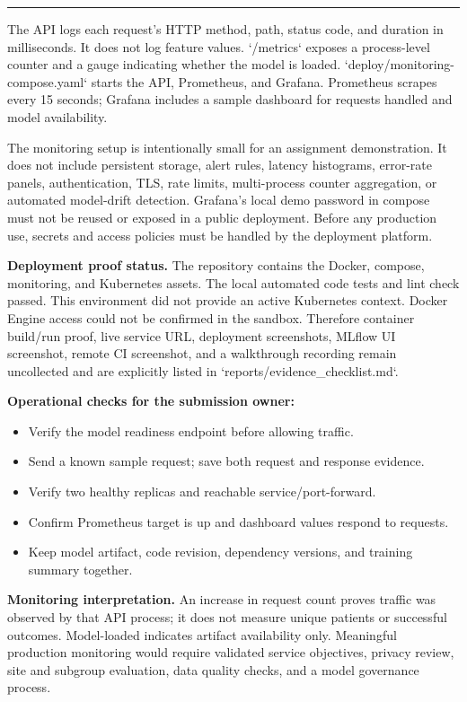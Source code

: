\documentclass[10pt]{article}
\newcommand{\sectiontitle}[1]{\vspace*{0.15in}{\Large\bfseries\color{navy}#1}\par\vspace{0.08in}\hrule\vspace{0.16in}}
\begin{document}
\newpage
\sectiontitle{8. Monitoring, logging, and operational boundaries}
The API logs each request's HTTP method, path, status code, and duration in milliseconds. It does not log feature values. `/metrics` exposes a process-level counter and a gauge indicating whether the model is loaded. `deploy/monitoring-compose.yaml` starts the API, Prometheus, and Grafana. Prometheus scrapes every 15 seconds; Grafana includes a sample dashboard for requests handled and model availability.

The monitoring setup is intentionally small for an assignment demonstration. It does not include persistent storage, alert rules, latency histograms, error-rate panels, authentication, TLS, rate limits, multi-process counter aggregation, or automated model-drift detection. Grafana's local demo password in compose must not be reused or exposed in a public deployment. Before any production use, secrets and access policies must be handled by the deployment platform.

\textbf{Deployment proof status.} The repository contains the Docker, compose, monitoring, and Kubernetes assets. The local automated code tests and lint check passed. This environment did not provide an active Kubernetes context. Docker Engine access could not be confirmed in the sandbox. Therefore container build/run proof, live service URL, deployment screenshots, MLflow UI screenshot, remote CI screenshot, and a walkthrough recording remain uncollected and are explicitly listed in `reports/evidence_checklist.md`.

\textbf{Operational checks for the submission owner:}
\begin{itemize}
\item Verify the model readiness endpoint before allowing traffic.
\item Send a known sample request; save both request and response evidence.
\item Verify two healthy replicas and reachable service/port-forward.
\item Confirm Prometheus target is up and dashboard values respond to requests.
\item Keep model artifact, code revision, dependency versions, and training summary together.
\end{itemize}

\textbf{Monitoring interpretation.} An increase in request count proves traffic was observed by that API process; it does not measure unique patients or successful outcomes. Model-loaded indicates artifact availability only. Meaningful production monitoring would require validated service objectives, privacy review, site and subgroup evaluation, data quality checks, and a model governance process.
\end{document}
